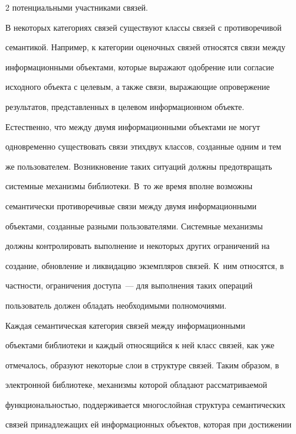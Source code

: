 \begin{multicols}{2}
потенциальными участниками связей. 


  


  В некоторых категориях связей существуют клас\-сы связей с противоречивой 


семантикой. Например, к категории оценочных связей относятся связи между 


информационными объектами, которые выражают одобрение или согласие 


исходного объекта с целевым, а также связи, выражающие опровержение 


результатов, представленных в целевом информационном объекте. 


Естественно, что между двумя информационными объектами не могут 


одновременно существовать связи этих\linebreak двух классов, созданные одним и тем 


же пользователем. Возникновение таких ситуаций долж\-ны предотвращать 


системные механизмы библиотеки. В~то же время вполне возможны 


семантически противоре\-чивые связи между двумя информационными 


объектами, созданные разными пользователями. Системные механизмы 


должны контролировать выполнение и некоторых других ограничений на 


создание, обновление и ликвидацию экземпляров связей. К~ним относятся, в 


частности, ограничения доступа~--- для выполнения таких операций 


пользователь должен обладать необходимыми полномочиями. 


  


  Каждая семантическая категория связей между информационными 


объектами библиотеки и каж\-дый относящийся к ней класс связей, как уже 


отмечалось, образуют некоторые слои в структуре связей. Таким образом, в 


электронной библиотеке, механизмы которой обладают рас\-смат\-ри\-ва\-емой\linebreak 


функциональностью, поддерживается многослойная структура семантических 


связей принадлежащих ей информационных объектов, которая при достижении 



\end{multicols}
